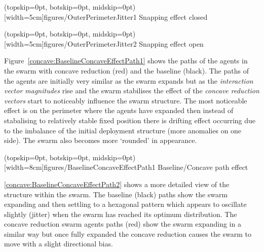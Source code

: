 \documentclass{ieeeaccess}
\begin{document}
\Figure[t!](topskip=0pt, botskip=0pt, midskip=0pt)[width=5cm]{figures/OuterPerimeterJitter1}
{Snapping effect closed\label{fig:OuterPerimeterJitter1}}


\Figure[t!](topskip=0pt, botskip=0pt, midskip=0pt)[width=5cm]{figures/OuterPerimeterJitter2}
{Snapping effect open\label{fig:OuterPerimeterJitter2}}


Figure~\ref{concave:BaselineConcaveEffectPath1} shows the paths of the agents in the swarm with concave reduction (red) and the baseline (black). The paths of the agents are initially very similar as the swarm expands but as the \textit{interaction vector magnitudes} rise and the swarm stabilises the effect of the \textit{concave reduction vectors} start to noticeably influence the swarm structure. The most noticeable effect is on the perimeter where the agents have expanded then instead of stabalising to relatively stable fixed position there is drifting effect occurring due to the imbalance of the initial deployment structure (more anomalies on one side). The swarm also becomes more `rounded' in appearance. 

\Figure[t!](topskip=0pt, botskip=0pt, midskip=0pt)[width=8cm]{figures/BaselineConcaveEffectPath1}
{Baseline/Concave path effect\label{concave:BaselineConcaveEffectPath1}}


\ref{concave:BaselineConcaveEffectPath2} shows a more detailed view of the structure within the swarm. The baseline (black) paths show the swarm expanding and then settling to a hexagonal pattern which appears to oscillate slightly (jitter) when the swarm has reached its optimum distribution. The concave reduction swarm agents paths (red) show the swarm expanding in a similar way but once fully expanded the concave reduction causes the swarm to move with a slight directional bias.
\end{document}
